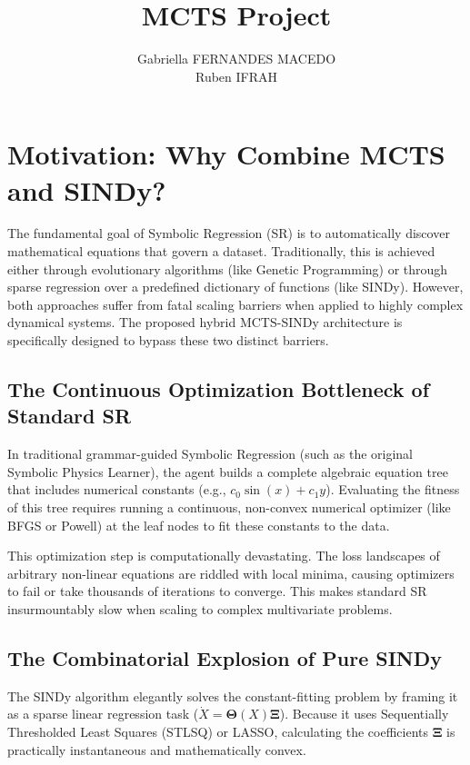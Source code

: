 \documentclass[11pt,a4paper]{article}
\title{MCTS Project}
\author{
Gabriella FERNANDES MACEDO \\
Ruben IFRAH \\
}
\date{}
\begin{document}
\maketitle


\tableofcontents

\newpage

\section{Motivation: Why Combine MCTS and SINDy?}
\label{sec:motivation}

The fundamental goal of Symbolic Regression (SR) is to automatically discover mathematical equations that govern a dataset. Traditionally, this is achieved either through evolutionary algorithms (like Genetic Programming) or through sparse regression over a predefined dictionary of functions (like SINDy). However, both approaches suffer from fatal scaling barriers when applied to highly complex dynamical systems. The proposed hybrid MCTS-SINDy architecture is specifically designed to bypass these two distinct barriers.

\subsection{The Continuous Optimization Bottleneck of Standard SR}
In traditional grammar-guided Symbolic Regression (such as the original Symbolic Physics Learner), the agent builds a complete algebraic equation tree that includes numerical constants (e.g., $c_0 \sin(x) + c_1 y$). Evaluating the fitness of this tree requires running a continuous, non-convex numerical optimizer (like BFGS or Powell) at the leaf nodes to fit these constants to the data. 

This optimization step is computationally devastating. The loss landscapes of arbitrary non-linear equations are riddled with local minima, causing optimizers to fail or take thousands of iterations to converge. This makes standard SR insurmountably slow when scaling to complex multivariate problems.

\subsection{The Combinatorial Explosion of Pure SINDy}
The SINDy algorithm elegantly solves the constant-fitting problem by framing it as a sparse linear regression task ($\dot{X} = \mathbf{\Theta}(X) \mathbf{\Xi}$). Because it uses Sequentially Thresholded Least Squares (STLSQ) or LASSO, calculating the coefficients $\mathbf{\Xi}$ is practically instantaneous and mathematically convex.
\end{document}
